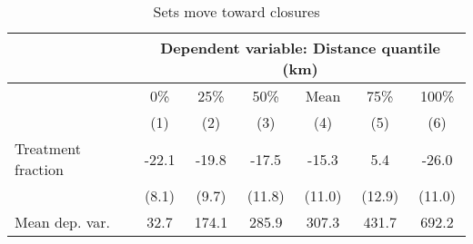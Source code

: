 \begin{table}[tb]
\centering
\caption{Sets move toward closures} 
\label{change_distance_closure}
\begin{tabular}{lcccccc}
   \toprule & \multicolumn{6}{c}{Dependent variable: Distance quantile (km)}  \\  \midrule  & 0\% & 25\% & 50\% & Mean & 75\% & 100\% \\ 
   & (1) & (2) & (3) & (4) & (5) & (6) \\ 
   \midrule Treatment fraction & -22.1 & -19.8 & -17.5 & -15.3 & 5.4 & -26.0 \\ 
   & (8.1) & (9.7) & (11.8) & (11.0) & (12.9) & (11.0) \\ 
   \midrule Mean dep. var. & 32.7 & 174.1 & 285.9 & 307.3 & 431.7 & 692.2 \\ 
  \end{tabular}
\end{table}
